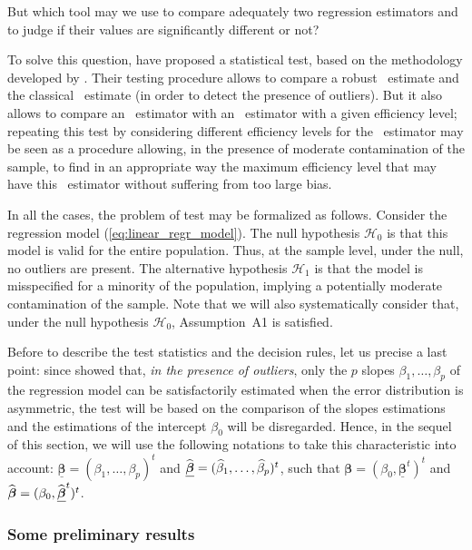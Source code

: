 But which tool may we use to compare adequately two regression estimators and
to judge if their values are significantly different or not?

To solve this question, \citet{Dehon:2009,Dehon:2012} have proposed a
statistical test, based on the methodology developed by \citet{Hausman:1978}.
Their testing procedure allows to compare a robust ~estimate and the
classical ~estimate (in order to detect the presence of outliers). But
it also allows to compare an ~estimator with an ~estimator
with a given efficiency level; repeating this test by considering different
efficiency levels for the ~estimator may be seen as a procedure
allowing, in the presence of moderate contamination of the sample, to find in
an appropriate way the maximum efficiency level that may have this 
~estimator without suffering from too large bias.

In all the cases, the problem of test may be formalized as follows. Consider
the regression model (\ref{eq:linear_regr_model}). The null hypothesis
$\mathcal{H}_0$ is that this model is valid for the entire population. Thus,
at the sample level, under the null, no outliers are present. The alternative
hypothesis $\mathcal{H}_1$ is that the model is misspecified for a
minority of the population, implying a potentially moderate contamination of
the sample. Note that we will also systematically consider that, under the
null hypothesis $\mathcal{H}_0$, Assumption~A1 is satisfied.

Before to describe the test statistics and the decision rules, let us precise a
last point: since \citet{Gervini:2002} showed that, \emph{in the presence of
outliers}, only the $p$ slopes $\beta_1, \dots, \beta_p$ of the regression
model can be satisfactorily estimated when the error distribution is
asymmetric, the test will be based on the comparison of the slopes estimations
and the estimations of the intercept $\beta_0$ will be disregarded. Hence, in
the sequel of this section, we will use the following notations to take this
characteristic into account: $\underline{\boldsymbol\beta} = (\beta_1, \dots,
\beta_p)^t$ and $\underline{\widehat{\boldsymbol\beta}} = (\widehat{\beta}_1,
\dots, \widehat{\beta}_p)^t$, such that $\boldsymbol\beta = (\beta_0,
\underline{\boldsymbol\beta}^t)^t$ and $\widehat{\boldsymbol\beta} = (\beta_0,
\underline{\widehat{\boldsymbol\beta}}^t)^t$.

\subsubsection{Some preliminary results}

